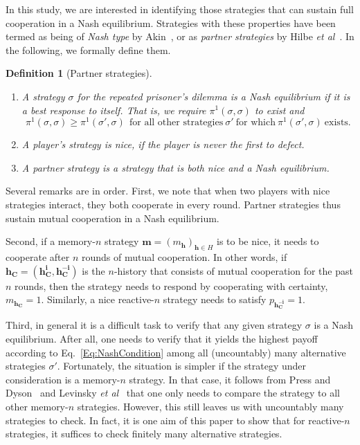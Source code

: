 \documentclass[11pt]{article}
\theoremstyle{plainCl1}
\theoremstyle{plainCl2}
\newtheorem{definition}{Definition}[section]
\begin{document}
In this study, we are interested in identifying those strategies that can sustain full cooperation in a Nash equilibrium. 
Strategies with these properties have been termed as being of {\it Nash type} by Akin~\citep{akin:EGADS:2016}, or as {\it partner strategies} by Hilbe {\it et al}~\citep{Hilbe:GEB:2015}. 
In the following, we formally define them. 

\begin{definition}[Partner strategies]
~\\[-1cm]
{
\renewcommand\labelenumi{(\roman{enumi})}
\begin{enumerate}[noitemsep,topsep=0pt]
\item A strategy $\sigma$ for the repeated prisoner's dilemma is a {\it Nash equilibrium} if it is a best response to itself. 
That is, we require $\pi^1(\sigma,\sigma)$ to exist and
\begin{equation} \label{Eq:NashCondition}
\pi^1(\sigma,\sigma) \!\ge\! \pi^1(\sigma',\sigma) ~~\text{for all other strategies}~\sigma'~\text{for which}~ \pi^1(\sigma',\sigma)~\text{exists}. 
\end{equation}
\item A player's strategy is \textit{nice}, if the player is never the first to defect. 
\item A \textit{partner strategy} is a strategy that is both nice and a Nash equilibrium.
\end{enumerate}
}
\end{definition}

\noindent
Several remarks are in order. First, we note that when two players with nice strategies interact, they both cooperate in every round. Partner strategies thus sustain mutual cooperation in a Nash equilibrium. 

Second, if a memory-$n$ strategy $\mathbf{m}\!=\!(m_\mathbf{h})_{\mathbf{h}\in H}$ is to be nice, it needs to cooperate after $n$ rounds of mutual cooperation. In other words, if $\mathbf{h_C} \!=\! (\mathbf{h^i_C},\mathbf{h^{-i}_C})$ is the $n$-history that consists of mutual cooperation for the past $n$ rounds, then the strategy needs to respond by cooperating with certainty, $m_\mathbf{h_C}\!=\!1$.  Similarly, a nice reactive-$n$ strategy needs to satisfy $p_\mathbf{h^{-i}_C}\!=\!1$. 

Third, in general it is a difficult task to verify that any given strategy $\sigma$ is a Nash equilibrium. 
After all, one needs to verify that it yields the highest payoff according to Eq.~\eqref{Eq:NashCondition} among all (uncountably) many alternative strategies $\sigma'$. 
Fortunately, the situation is simpler if the strategy under consideration is a memory-$n$ strategy. 
In that case, it follows from Press and Dyson~\cite{press:PNAS:2012} and Levinsky {\it et al}~\citep{Levinsky:IJGT:2020} that one only needs to compare the strategy to all other memory-$n$ strategies. 
However, this still leaves us with uncountably many strategies to check. 
In fact, it is one aim of this paper to show that for reactive-$n$ strategies, it suffices to check finitely many alternative strategies. 
\end{document}
